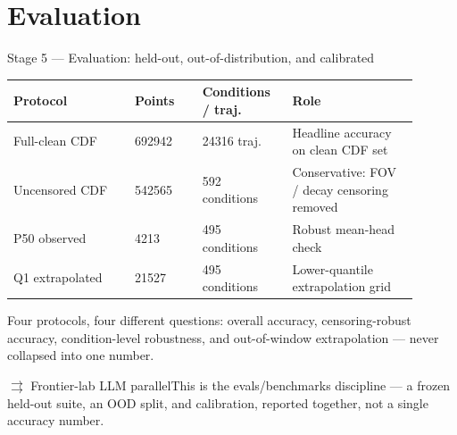 \documentclass[aspectratio=169,11pt]{beamer}
\newcommand{\llmparallel}[1]{%
  \begin{block}{$\rightrightarrows$ Frontier-lab LLM parallel}#1\end{block}}
\begin{document}
\section{Evaluation}

\begin{frame}{Stage 5 --- Evaluation: held-out, out-of-distribution, and calibrated}
\small
\begin{tabular}{L{0.27\linewidth}R{0.15\linewidth}R{0.20\linewidth}L{0.28\linewidth}}
\toprule
Protocol & Points & Conditions / traj. & Role \\
\midrule
Full-clean CDF & \num{692942} & \num{24316} traj. & Headline accuracy on clean CDF set \\
Uncensored CDF & \num{542565} & 592 conditions & Conservative: FOV / decay censoring removed \\
P50 observed & \num{4213} & 495 conditions & Robust mean-head check \\
Q1 extrapolated & \num{21527} & 495 conditions & Lower-quantile extrapolation grid \\
\bottomrule
\end{tabular}

\vspace{0.5em}
\footnotesize
Four protocols, four different questions: overall accuracy, censoring-robust accuracy,
condition-level robustness, and out-of-window extrapolation --- never collapsed into one number.

\llmparallel{This is the evals/benchmarks discipline --- a frozen held-out suite, an OOD split,
and calibration, reported together, not a single accuracy number.}
\end{frame}
\end{document}
